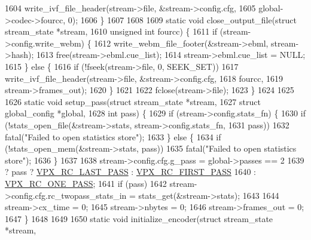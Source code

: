 \begin{DoxyCodeInclude}
{{{{{{{{{{{{{{{{{{{{{{{{{{{{{{{{{{{{{{{{{{{{{{1604     write\_ivf\_file\_header(stream->file, &stream->config.cfg,
1605                           global->codec->fourcc, 0);
1606 \}
1607 
1608 
1609 \textcolor{keyword}{static} \textcolor{keywordtype}{void} close\_output\_file(\textcolor{keyword}{struct} stream\_state *stream,
1610                               \textcolor{keywordtype}{unsigned} \textcolor{keywordtype}{int}         fourcc) \{
1611   \textcolor{keywordflow}{if} (stream->config.write\_webm) \{
1612     write\_webm\_file\_footer(&stream->ebml, stream->hash);
1613     free(stream->ebml.cue\_list);
1614     stream->ebml.cue\_list = NULL;
1615   \} \textcolor{keywordflow}{else} \{
1616     \textcolor{keywordflow}{if} (!fseek(stream->file, 0, SEEK\_SET))
1617       write\_ivf\_file\_header(stream->file, &stream->config.cfg,
1618                             fourcc,
1619                             stream->frames\_out);
1620   \}
1621 
1622   fclose(stream->file);
1623 \}
1624 
1625 
1626 \textcolor{keyword}{static} \textcolor{keywordtype}{void} setup\_pass(\textcolor{keyword}{struct} stream\_state  *stream,
1627                        \textcolor{keyword}{struct} global\_config *global,
1628                        \textcolor{keywordtype}{int}                   pass) \{
1629   \textcolor{keywordflow}{if} (stream->config.stats\_fn) \{
1630     \textcolor{keywordflow}{if} (!stats\_open\_file(&stream->stats, stream->config.stats\_fn,
1631                          pass))
1632       fatal(\textcolor{stringliteral}{"Failed to open statistics store"});
1633   \} \textcolor{keywordflow}{else} \{
1634     \textcolor{keywordflow}{if} (!stats\_open\_mem(&stream->stats, pass))
1635       fatal(\textcolor{stringliteral}{"Failed to open statistics store"});
1636   \}
1637 
1638   stream->config.cfg.g\_pass = global->passes == 2
1639                               ? pass ? \hyperlink{group__encoder_gga476c5417f9c15a1dc5d3f68fa44c493fa65da543b956d6a9b1f301ab8cc90d3a7}{VPX\_RC\_LAST\_PASS} : 
      \hyperlink{group__encoder_gga476c5417f9c15a1dc5d3f68fa44c493faa0765945345b160905f3b762986dae3b}{VPX\_RC\_FIRST\_PASS}
1640                             : \hyperlink{group__encoder_gga476c5417f9c15a1dc5d3f68fa44c493fa7b6943a41868e8e26a77e9500f139ca1}{VPX\_RC\_ONE\_PASS};
1641   \textcolor{keywordflow}{if} (pass)
1642     stream->config.cfg.rc\_twopass\_stats\_in = stats\_get(&stream->stats);
1643 
1644   stream->cx\_time = 0;
1645   stream->nbytes = 0;
1646   stream->frames\_out = 0;
1647 \}
1648 
1649 
1650 \textcolor{keyword}{static} \textcolor{keywordtype}{void} initialize\_encoder(\textcolor{keyword}{struct} stream\_state  *stream,
}}}}}}}}}}}}}}}}}}}}}}}}}}}}}}}}}}}}}}}}}}}}}}
\end{DoxyCodeInclude}
